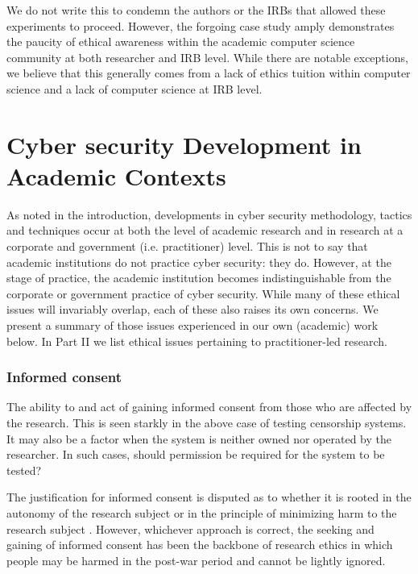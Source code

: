 \documentclass{svjour3}                     %
\begin{document}
We do not write this to condemn the authors or the IRBs that allowed these experiments to proceed. However, the forgoing case study amply demonstrates the paucity of ethical awareness within the academic computer science community at both researcher and IRB level. While there are notable exceptions, we believe that this generally comes from a lack of ethics tuition within computer science and a lack of computer science at IRB level.


\section{Cyber security Development in Academic Contexts}
\label{sec:academicdev}
As noted in the introduction, developments in cyber security methodology, tactics and techniques occur at both the level of academic research and in research at a corporate and government (i.e. practitioner) level.  This is not to say that academic institutions do not practice cyber security: they do. However, at the stage of practice, the academic institution becomes indistinguishable from the corporate or government practice of cyber security. While many of these ethical issues will invariably overlap, each of these also raises its own concerns. We present a summary of those issues experienced in our own (academic) work below. In Part II we list ethical issues pertaining to practitioner-led research.

\subsubsection{Informed consent}
The ability to and act of gaining informed consent from those who are affected by the research.  This is seen starkly in the above case of testing censorship systems. It may also be a factor when the system is neither owned nor operated by the researcher. In such cases, should permission be required for the system to be tested?

The justification for informed consent is disputed as to whether it is rooted in the autonomy of the research subject \cite{beauchamp2009autonomy} or in the principle of minimizing harm to the research subject \cite{manson2007rethinking}. However, whichever approach is correct, the seeking and gaining of informed consent has been the backbone of research ethics in which people may be harmed in the post-war period and cannot be lightly ignored.
\end{document}
